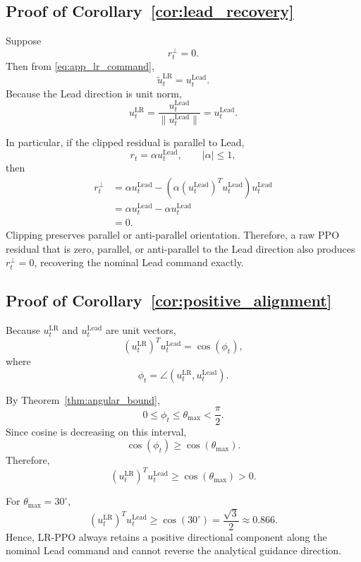 \documentclass[10pt]{article}
\begin{document}
\subsection*{Proof of Corollary~\ref{cor:lead_recovery}}

Suppose
\[
r_t^\perp=0.
\]
Then from \eqref{eq:app_lr_command},
\[
\tilde u_t^{\mathrm{LR}}
=
u_t^{\mathrm{Lead}}.
\]
Because the Lead direction is unit norm,
\[
u_t^{\mathrm{LR}}
=
\frac{u_t^{\mathrm{Lead}}}
{\|u_t^{\mathrm{Lead}}\|}
=
u_t^{\mathrm{Lead}}.
\]

In particular, if the clipped residual is parallel to Lead,
\[
r_t
=
\alpha u_t^{\mathrm{Lead}},
\qquad
|\alpha|\leq1,
\]
then
\begin{align}
r_t^\perp
&=
\alpha u_t^{\mathrm{Lead}}
-
\left(
\alpha
\left(u_t^{\mathrm{Lead}}\right)^T
u_t^{\mathrm{Lead}}
\right)
u_t^{\mathrm{Lead}} \\
&=
\alpha u_t^{\mathrm{Lead}}
-
\alpha u_t^{\mathrm{Lead}} \\
&=0.
\end{align}
Clipping preserves parallel or anti-parallel orientation. Therefore, a raw PPO
residual that is zero, parallel, or anti-parallel to the Lead direction also
produces \(r_t^\perp=0\), recovering the nominal Lead command exactly.


\subsection*{Proof of Corollary~\ref{cor:positive_alignment}}

Because
\(u_t^{\mathrm{LR}}\)
and
\(u_t^{\mathrm{Lead}}\)
are unit vectors,
\begin{equation}
\left(u_t^{\mathrm{LR}}\right)^T
u_t^{\mathrm{Lead}}
=
\cos(\phi_t),
\end{equation}
where
\[
\phi_t
=
\angle
\left(
u_t^{\mathrm{LR}},
u_t^{\mathrm{Lead}}
\right).
\]

By Theorem~\ref{thm:angular_bound},
\[
0\leq\phi_t\leq\theta_{\max}<\frac{\pi}{2}.
\]
Since cosine is decreasing on this interval,
\[
\cos(\phi_t)
\geq
\cos(\theta_{\max}).
\]
Therefore,
\begin{equation}
\left(u_t^{\mathrm{LR}}\right)^T
u_t^{\mathrm{Lead}}
\geq
\cos(\theta_{\max})
>
0.
\end{equation}

For \(\theta_{\max}=30^\circ\),
\begin{equation}
\left(u_t^{\mathrm{LR}}\right)^T
u_t^{\mathrm{Lead}}
\geq
\cos(30^\circ)
=
\frac{\sqrt{3}}{2}
\approx0.866.
\end{equation}
Hence, LR-PPO always retains a positive directional component along the
nominal Lead command and cannot reverse the analytical guidance direction.
\end{document}
